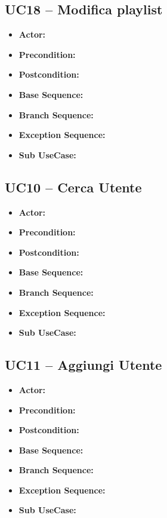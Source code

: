\subsection{\textbf{UC18 -- Modifica playlist}}
\begin{itemize}
    \item \textbf{Actor:}
    \item \textbf{Precondition:}
    \item \textbf{Postcondition:}
    \item \textbf{Base Sequence:}
    \item \textbf{Branch Sequence:}
    \item \textbf{Exception Sequence:}
    \item \textbf{Sub UseCase:}
\end{itemize}

\subsection{\textbf{UC10 -- Cerca Utente}}
\begin{itemize}
    \item \textbf{Actor:}
    \item \textbf{Precondition:}
    \item \textbf{Postcondition:}
    \item \textbf{Base Sequence:}
    \item \textbf{Branch Sequence:}
    \item \textbf{Exception Sequence:}
    \item \textbf{Sub UseCase:}
\end{itemize}

\subsection{\textbf{UC11 -- Aggiungi Utente}}
\begin{itemize}
    \item \textbf{Actor:}
    \item \textbf{Precondition:}
    \item \textbf{Postcondition:}
    \item \textbf{Base Sequence:}
    \item \textbf{Branch Sequence:}
    \item \textbf{Exception Sequence:}
    \item \textbf{Sub UseCase:}
\end{itemize}

